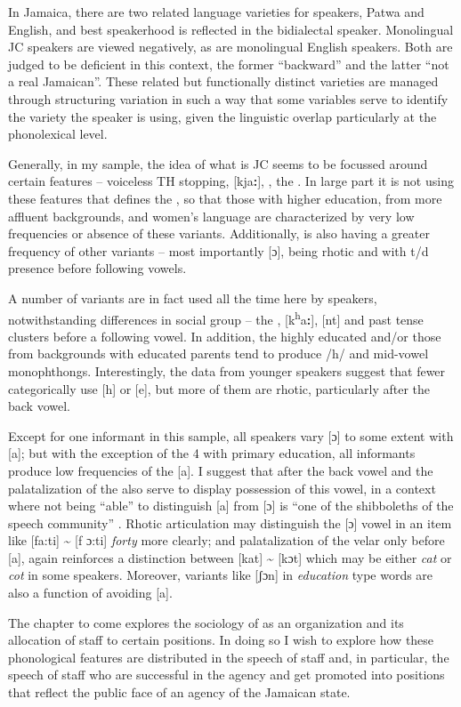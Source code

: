 In Jamaica, there are two related language varieties for speakers, Patwa and English, and best speakerhood is reflected in the bidialectal speaker.  Monolingual JC speakers are viewed negatively, as are monolingual English speakers.  Both are judged to be deficient in this context, the former “backward” and the latter “not a real Jamaican”.  These related but functionally distinct varieties are managed through structuring variation in such a way that some variables serve to identify the variety the speaker is using, given the linguistic overlap particularly at the phonolexical level.  

Generally, in my sample, the idea of what is JC seems to be focussed around certain features – voiceless TH stopping, [kja\textbf{:}], , the .  In large part it is not using these features that defines the , so that those with higher education, from more affluent backgrounds, and women’s language are characterized by very low frequencies or absence of these variants.  Additionally,  is also having a greater frequency of other variants – most importantly [ɔ], being rhotic and with t\slash d presence before following vowels.  

  A number of variants are in fact used all the time here by speakers, notwithstanding differences in social group – the , [k\textsuperscript{h}a\textbf{:}], [nt] and past tense clusters before a following vowel.  In addition, the highly educated and/or those from backgrounds with educated parents tend to produce /h/ and mid-vowel monophthongs.  Interestingly, the data from younger speakers suggest that fewer categorically use [h] or [e], but more of them are rhotic, particularly after the back vowel. 

  Except for one informant in this sample, all speakers vary [ɔ] to some extent with [a]; but with the exception of the 4 with primary education, all informants produce low frequencies of the [a].   I suggest that  after the back vowel and the palatalization of the  also serve to display possession of this vowel, in a context where not being “able” to distinguish [a] from [ɔ] is “one of the shibboleths of the speech community” \citep[272]{DevonishHarry2004}.  Rhotic articulation may distinguish the [ɔ] vowel in an item like [fa:ti] {\textasciitilde} [f ɔ:ti] \textit{forty} more clearly; and palatalization of the velar only before [a], again reinforces a distinction between [kat] {\textasciitilde} [kɔt] which may be either \textit{cat} or \textit{cot} in some speakers.  Moreover,  variants like [ʃɔn] in \textit{education} type words are also a function of avoiding [a].

The chapter to come explores the sociology of  as an organization and its allocation of staff to certain positions.  In doing so I wish to explore how these phonological features are distributed in the speech of  staff and, in particular, the speech of staff who are successful in the agency and get promoted into positions that reflect the public face of an agency of the Jamaican state.

